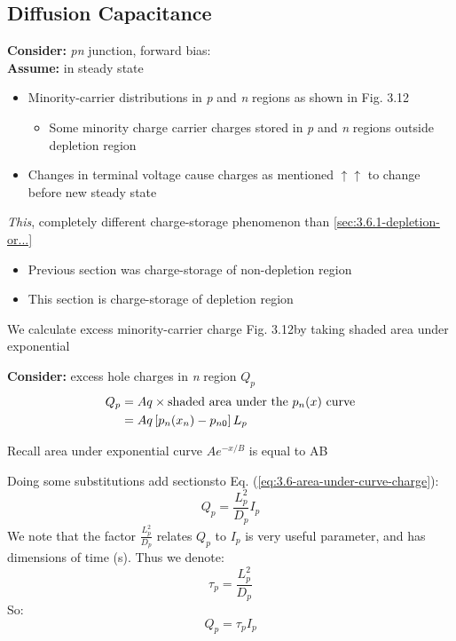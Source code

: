 \documentclass{report}
\begin{document}

\subsection{Diffusion Capacitance}

\textbf{Consider:} \textit{pn} junction, forward bias: \\
\textbf{Assume:} in steady state
\begin{itemize}
	\item Minority-carrier distributions in \textit{p} and \textit{n} regions as shown in \textlangle Fig. 3.12\textrangle
		\begin{itemize}
			\item Some minority charge carrier charges stored in \textit{p} and \textit{n} regions outside depletion region
		\end{itemize}
	\item Changes in terminal voltage cause charges as mentioned $\uparrow$$\uparrow$ to change before new steady state
\end{itemize}
\textit{This}, completely different charge-storage phenomenon than \ref{sec:3.6.1-depletion-or...}
\begin{itemize}
	\item Previous section was charge-storage of non-depletion region
	\item This section is charge-storage of depletion region
\end{itemize}

We calculate excess minority-carrier charge \textlangle Fig. 3.12\textrangle by taking shaded area under exponential

\textbf{Consider:} excess hole charges in \textit{n} region $Q_p$
\begin{align}
	Q_p &= Aq \times \text{shaded area under the $p_n(x)$ curve}\notag \\
		&= Aq \left[p_n(x_n) - p_{n0}\right]L_p \label{eq:3.6-area-under-curve-charge}
\end{align}
\begin{note}
	Recall area under exponential curve $Ae^{-x/B}$ is equal to AB
\end{note}

Doing some substitutions \textlangle add sections\textrangle to Eq. (\ref{eq:3.6-area-under-curve-charge}):
\begin{equation}
	Q_p = \frac{L_p^2}{D_p}I_p
\end{equation}
We note that the factor $\frac{L_p^2}{D_p}$ relates $Q_p$ to $I_p$ is very useful parameter, and has dimensions of time (s). Thus we denote:
\begin{equation}
	\tau_p = \frac{L_p^2}{D_p}
\end{equation}
So:
\begin{equation}
	Q_p = \tau_p I_p \label{eq:3.6-qptpip}
\end{equation}
\end{document}
